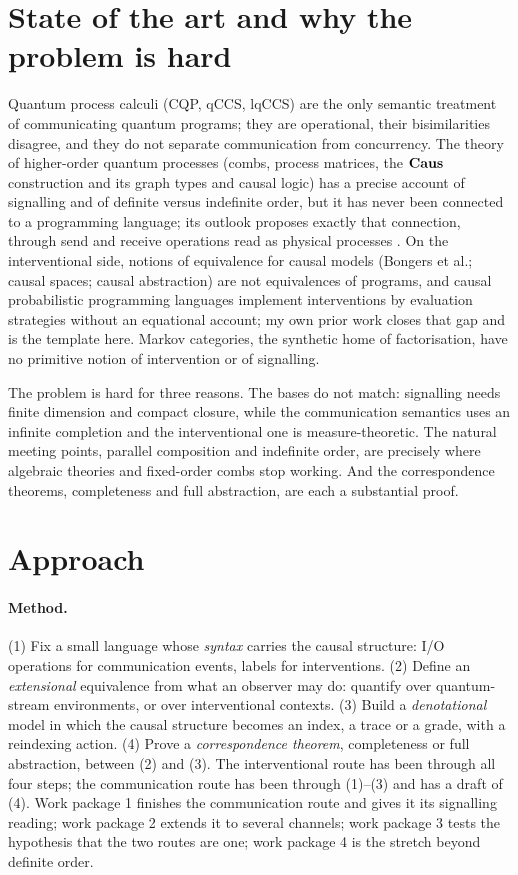 \section{State of the art and why the problem is hard}

Quantum process calculi (CQP, qCCS, lqCCS) are the only semantic treatment of communicating quantum programs; they are operational, their bisimilarities disagree, and they do not separate communication from concurrency. The theory of higher-order quantum processes (combs, process matrices, the $\mathbf{Caus}$ construction and its graph types and causal logic) has a precise account of signalling and of definite versus indefinite order, but it has never been connected to a programming language; its outlook proposes exactly that connection, through send and receive operations read as physical processes \cite{simmons2024thesis}. On the interventional side, notions of equivalence for causal models (Bongers et al.; causal spaces; causal abstraction) are not equivalences of programs, and causal probabilistic programming languages implement interventions by evaluation strategies without an equational account; my own prior work closes that gap and is the template here. Markov categories, the synthetic home of factorisation, have no primitive notion of intervention or of signalling.

The problem is hard for three reasons. The bases do not match: signalling needs finite dimension and compact closure, while the communication semantics uses an infinite completion and the interventional one is measure-theoretic. The natural meeting points, parallel composition and indefinite order, are precisely where algebraic theories and fixed-order combs stop working. And the correspondence theorems, completeness and full abstraction, are each a substantial proof.

\section{Approach}\label{sec:approach}

\paragraph{Method.} (1) Fix a small language whose \emph{syntax} carries the causal structure: I/O operations for communication events, labels for interventions. (2) Define an \emph{extensional} equivalence from what an observer may do: quantify over quantum-stream environments, or over interventional contexts. (3) Build a \emph{denotational} model in which the causal structure becomes an index, a trace or a grade, with a reindexing action. (4) Prove a \emph{correspondence theorem}, completeness or full abstraction, between (2) and (3). The interventional route has been through all four steps; the communication route has been through (1)--(3) and has a draft of (4). Work package 1 finishes the communication route and gives it its signalling reading; work package 2 extends it to several channels; work package 3 tests the hypothesis that the two routes are one; work package 4 is the stretch beyond definite order.


